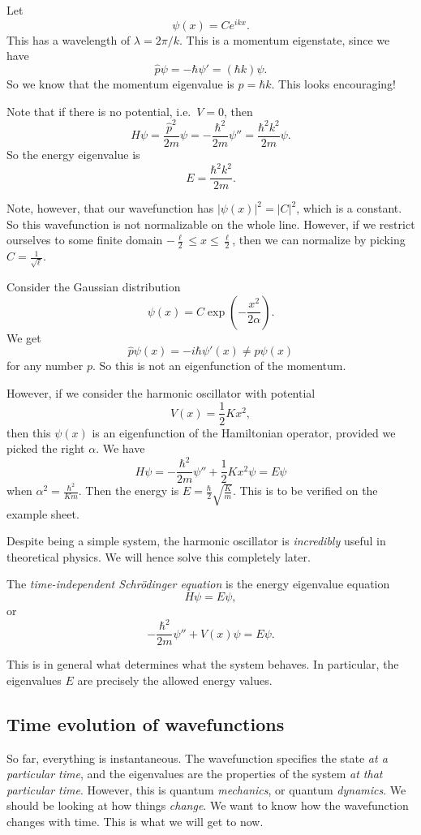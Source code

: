 \documentclass[a4paper]{article}
\begin{document}
\begin{eg}
  Let
  \[
    \psi(x) = Ce^{ikx}.
  \]
  This has a wavelength of $\lambda = 2\pi/k$. This is a momentum eigenstate, since we have
  \[
    \hat{p}\psi = -\hbar \psi' = (\hbar k)\psi.
  \]
  So we know that the momentum eigenvalue is $p = \hbar k$. This looks encouraging!

  Note that if there is no potential, i.e.\ $V = 0$, then
  \[
    H\psi = \frac{\hat{p}^2}{2m}\psi = -\frac{\hbar^2}{2m}\psi'' = \frac{\hbar^2 k^2}{2m}\psi.
  \]
  So the energy eigenvalue is
  \[
    E = \frac{\hbar^2 k^2}{2m}.
  \]
\end{eg}
Note, however, that our wavefunction has $|\psi(x)|^2 = |C|^2$, which is a constant. So this wavefunction is not normalizable on the whole line. However, if we restrict ourselves to some finite domain $-\frac{\ell}{2} \leq x \leq \frac{\ell}{2}$, then we can normalize by picking $C= \frac{1}{\sqrt{\ell}}$.

\begin{eg}
  Consider the Gaussian distribution
  \[
    \psi(x) = C\exp\left(-\frac{x^2}{2\alpha}\right).
  \]
  We get
  \[
    \hat{p}\psi(x) = -i\hbar \psi'(x) \not= p\psi(x)
  \]
  for any number $p$. So this is not an eigenfunction of the momentum.

  However, if we consider the harmonic oscillator with potential
  \[
    V(x) = \frac{1}{2}Kx^2,
  \]
  then this $\psi(x)$ is an eigenfunction of the Hamiltonian operator, provided we picked the right $\alpha$. We have
  \[
    H\psi = -\frac{\hbar^2}{2m}\psi'' + \frac{1}{2}Kx^2 \psi = E\psi
  \]
  when $\alpha^2 = \frac{\hbar^2}{Km}$. Then the energy is $E = \frac{\hbar}{2}\sqrt{\frac{K}{m}}$. This is to be verified on the example sheet.
\end{eg}
Despite being a simple system, the harmonic oscillator is \emph{incredibly} useful in theoretical physics. We will hence solve this completely later.

\begin{defi}
  The \emph{time-independent Schr\"odinger equation} is the energy eigenvalue equation
  \[
    H\psi = E\psi,
  \]
  or
  \[
    -\frac{\hbar^2}{2m}\psi'' + V(x) \psi = E\psi.
  \]
\end{defi}
This is in general what determines what the system behaves. In particular, the eigenvalues $E$ are precisely the allowed energy values.

\subsection{Time evolution of wavefunctions}
So far, everything is instantaneous. The wavefunction specifies the state \emph{at a particular time}, and the eigenvalues are the properties of the system \emph{at that particular time}. However, this is quantum \emph{mechanics}, or quantum \emph{dynamics}. We should be looking at how things \emph{change}. We want to know how the wavefunction changes with time. This is what we will get to now.
\end{document}
